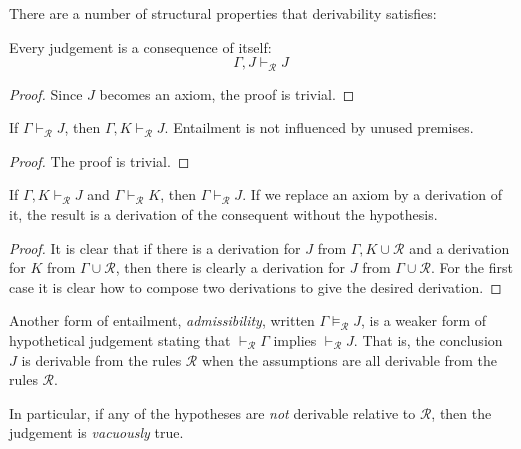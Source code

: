 There are a number of structural properties that derivability satisfies:

\begin{lemma}[Reflexivity]
    Every judgement is a consequence of itself: $$\Gamma, J\vdash_{\mathcal{R}} J$$
\end{lemma}

\begin{proof}
    Since $J$ becomes an axiom, the proof is trivial.
\end{proof}


\begin{lemma}[Weakening]
    If $\Gamma \vdash_{\mathcal{R}} J$, then $\Gamma, K \vdash_{\mathcal{R}} J$. Entailment is not influenced by unused premises.
\end{lemma}

\begin{proof}
    The proof is trivial.
\end{proof}


\begin{lemma}[Transitivity]\label{derivability_transitivity}
    If $\Gamma, K \vdash_{\mathcal{R}} J$ and $\Gamma \vdash_{\mathcal{R}} K$, then $\Gamma \vdash_{\mathcal{R}} J$. If we replace an axiom by a derivation of it, the result is a derivation of the consequent without the hypothesis.
\end{lemma}

\begin{proof}
    It is clear that if there is a derivation for $J$ from $\Gamma,K \cup \mathcal{R}$ and a derivation for $K$ from $\Gamma \cup \mathcal{R}$, then there is clearly a derivation for $J$ from $\Gamma \cup \mathcal{R}$. For the first case it is clear how to compose two derivations to give the desired derivation.
\end{proof}

\begin{defin}
    Another form of entailment, \emph{admissibility}, written $\Gamma \vDash_{\mathcal{R}} J$, is a weaker form of hypothetical judgement stating that $\vdash_{\mathcal{R}} \Gamma$ implies $\vdash_{\mathcal{R}} J$. That is, the conclusion $J$ is derivable from the rules $\mathcal{R}$ when the assumptions are all derivable from the rules $\mathcal{R}$.
\end{defin}

\begin{remark}
    In particular, if any of the hypotheses are \emph{not} derivable relative to $\mathcal{R}$, then the judgement is \emph{vacuously} true.
\end{remark}


